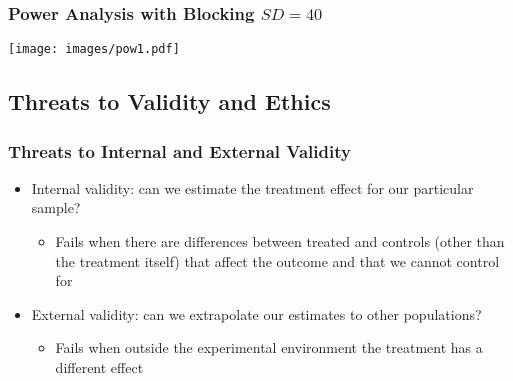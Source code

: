 \documentclass{beamer}
\numberwithin{equation}{section}
\begin{document}
\begin{frame}
  \frametitle{Power Analysis with Blocking $SD=40$}
  \centering
  \texttt{[image: images/pow1.pdf]}
\end{frame}


\subsection{Threats to Validity and Ethics}



\begin{frame}
  \frametitle{Threats to Internal and External Validity}
  
\begin{itemize}
\item Internal validity: can we estimate the treatment effect for our particular sample?
\begin{itemize}
\item Fails when there are differences between treated and controls (other than the treatment itself) that affect the outcome and that we cannot control for
\end{itemize}\bigskip
\item External validity: can we extrapolate our estimates to other populations?
\begin{itemize}
\item Fails when outside the experimental environment the treatment has a different effect
\end{itemize}
\end{itemize}

\end{frame}
\end{document}
